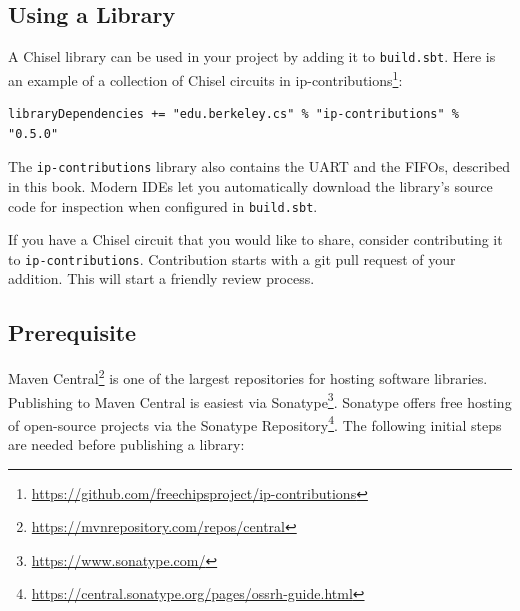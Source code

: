 \documentclass[%
    10pt,
    headinclude, footinclude=false,
    openright, %
    notitlepage,
    cleardoublepage=empty,
    headsepline,
    numbers=noenddot,
    bibliography=totoc, index=totoc,
    ]{scrbook}
\newcommand{\code}[1]{{\lstinline[basicstyle=\small\ttfamily]{#1}}}
\newcommand{\myref}[2]{\href{#1}{#2}}
\renewcommand{\myref}[2]{{#2}{\footnote{\url{#1}}}}
\begin{document}
\subsection{Using a Library}

A Chisel library can be used in your project by adding it to \code{build.sbt}. Here is an
example of a collection of Chisel circuits in \myref{https://github.com/freechipsproject/ip-contributions}{ip-contributions}:

\begin{verbatim}
libraryDependencies += "edu.berkeley.cs" % "ip-contributions" % "0.5.0"
\end{verbatim}

\noindent The \code{ip-contributions} library also contains the UART and the FIFOs, described in this book.
Modern IDEs let you automatically download the library's source code for inspection when configured
in \code{build.sbt}.

If you have a Chisel circuit that you would like to share, consider contributing it to \code{ip-contributions}.
Contribution starts with a git pull request of your addition. This will start a friendly review process.

\subsection{Prerequisite}

\myref{https://mvnrepository.com/repos/central}{Maven Central} is one of the largest repositories for
hosting software libraries. Publishing to Maven Central is easiest via
\myref{https://www.sonatype.com/}{Sonatype}. Sonatype offers free hosting of open-source
projects via the \myref{https://central.sonatype.org/pages/ossrh-guide.html}{Sonatype Repository}.
The following initial steps are needed before publishing a library:
\end{document}
